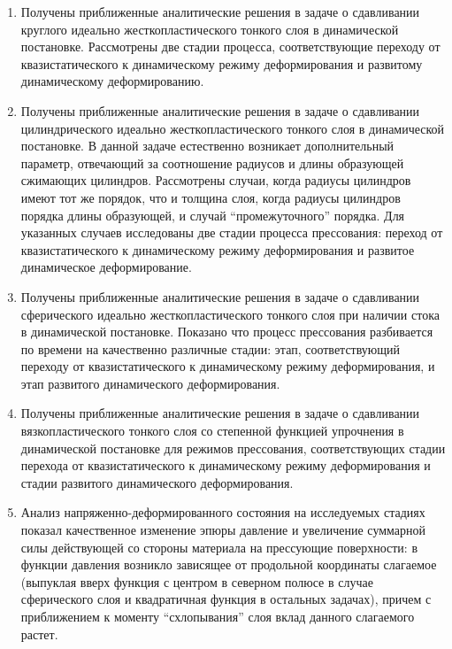 \begin{enumerate}
  \item Получены приближенные аналитические решения в задаче о сдавливании круглого идеально жесткопластического тонкого слоя в динамической постановке. Рассмотрены две стадии процесса, соответствующие переходу от квазистатического к динамическому режиму деформирования и развитому динамическому деформированию.
  \item Получены приближенные аналитические решения в задаче о сдавливании цилиндрического идеально жесткопластического тонкого слоя в динамической постановке. В данной задаче естественно возникает дополнительный параметр, отвечающий за соотношение радиусов и длины образующей сжимающих цилиндров. Рассмотрены случаи, когда радиусы цилиндров имеют тот же порядок, что и толщина слоя, когда радиусы цилиндров порядка длины образующей, и случай ``промежуточного'' порядка. Для указанных случаев исследованы две стадии процесса прессования: переход от квазистатического к динамическому режиму деформирования и развитое динамическое деформирование.
  \item Получены приближенные аналитические решения в задаче о сдавливании сферического идеально жесткопластического тонкого слоя при наличии стока в динамической постановке. Показано что процесс прессования разбивается по времени на качественно различные стадии: этап, соответствующий переходу от квазистатического к динамическому режиму деформирования, и этап развитого динамического деформирования.
  \item Получены приближенные аналитические решения в задаче о сдавливании вязкопластического тонкого слоя со степенной функцией упрочнения в динамической постановке для режимов прессования, соответствующих стадии перехода от квазистатического к динамическому режиму деформирования и стадии развитого динамического деформирования.
  \item Анализ напряженно-деформированного состояния на исследуемых стадиях показал качественное изменение эпюры давление и увеличение суммарной силы действующей со стороны материала на прессующие поверхности: в функции давления возникло зависящее от продольной координаты слагаемое (выпуклая вверх функция с центром в северном полюсе в случае сферического слоя и квадратичная функция в остальных задачах), причем с приближением к моменту ``схлопывания'' слоя вклад данного слагаемого растет.

\end{enumerate}
